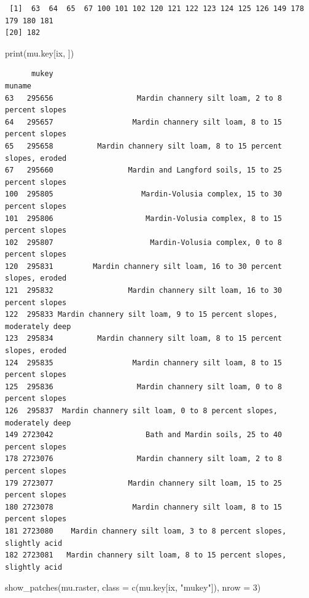 \documentclass[
  letterpaper,
  DIV=11,
  numbers=noendperiod]{scrartcl}
\newenvironment{Shaded}{\begin{snugshade}}{\end{snugshade}}
\newcommand{\AttributeTok}[1]{\textcolor[rgb]{0.40,0.45,0.13}{#1}}
\newcommand{\DecValTok}[1]{\textcolor[rgb]{0.68,0.00,0.00}{#1}}
\newcommand{\FunctionTok}[1]{\textcolor[rgb]{0.28,0.35,0.67}{#1}}
\newcommand{\NormalTok}[1]{\textcolor[rgb]{0.00,0.23,0.31}{#1}}
\newcommand{\StringTok}[1]{\textcolor[rgb]{0.13,0.47,0.30}{#1}}
\begin{document}
\begin{verbatim}
 [1]  63  64  65  67 100 101 102 120 121 122 123 124 125 126 149 178 179 180 181
[20] 182
\end{verbatim}

\begin{Shaded}
\begin{Highlighting}[]
\FunctionTok{print}\NormalTok{(mu.key[ix, ])}
\end{Highlighting}
\end{Shaded}

\begin{verbatim}
      mukey                                                             muname
63   295656                   Mardin channery silt loam, 2 to 8 percent slopes
64   295657                  Mardin channery silt loam, 8 to 15 percent slopes
65   295658          Mardin channery silt loam, 8 to 15 percent slopes, eroded
67   295660                 Mardin and Langford soils, 15 to 25 percent slopes
100  295805                    Mardin-Volusia complex, 15 to 30 percent slopes
101  295806                     Mardin-Volusia complex, 8 to 15 percent slopes
102  295807                      Mardin-Volusia complex, 0 to 8 percent slopes
120  295831         Mardin channery silt loam, 16 to 30 percent slopes, eroded
121  295832                 Mardin channery silt loam, 16 to 30 percent slopes
122  295833 Mardin channery silt loam, 9 to 15 percent slopes, moderately deep
123  295834          Mardin channery silt loam, 8 to 15 percent slopes, eroded
124  295835                  Mardin channery silt loam, 8 to 15 percent slopes
125  295836                   Mardin channery silt loam, 0 to 8 percent slopes
126  295837  Mardin channery silt loam, 0 to 8 percent slopes, moderately deep
149 2723042                     Bath and Mardin soils, 25 to 40 percent slopes
178 2723076                   Mardin channery silt loam, 2 to 8 percent slopes
179 2723077                 Mardin channery silt loam, 15 to 25 percent slopes
180 2723078                  Mardin channery silt loam, 8 to 15 percent slopes
181 2723080    Mardin channery silt loam, 3 to 8 percent slopes, slightly acid
182 2723081   Mardin channery silt loam, 8 to 15 percent slopes, slightly acid
\end{verbatim}

\begin{Shaded}
\begin{Highlighting}[]
\FunctionTok{show\_patches}\NormalTok{(mu.raster, }
             \AttributeTok{class =} \FunctionTok{c}\NormalTok{(mu.key[ix, }\StringTok{"mukey"}\NormalTok{]), }\AttributeTok{nrow =} \DecValTok{3}\NormalTok{)}
\end{Highlighting}
\end{Shaded}
\end{document}
